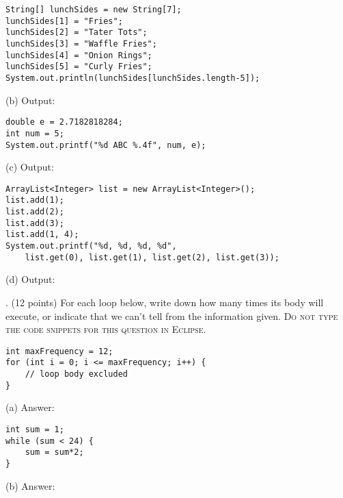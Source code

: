 \documentclass[12pt,twoside]{article}
\newcommand{\fillInBlank}[1][0.5in]{\underline{\hspace{#1}}}
\begin{document}
\vfill
\hfill
\begin{minipage}{0.60\linewidth}
\begin{lstlisting}
String[] lunchSides = new String[7];
lunchSides[1] = "Fries";
lunchSides[2] = "Tater Tots";
lunchSides[3] = "Waffle Fries";
lunchSides[4] = "Onion Rings";
lunchSides[5] = "Curly Fries";
System.out.println(lunchSides[lunchSides.length-5]);
\end{lstlisting}
\end{minipage}
\hspace{0.25in}
(b) Output: \fillInBlank[1in]

\vfill
\hfill
\begin{minipage}{0.60\linewidth}
\begin{lstlisting}
double e = 2.7182818284;
int num = 5;
System.out.printf("%d ABC %.4f", num, e);
\end{lstlisting}
\end{minipage}
\hspace{0.25in}
(c) Output: \fillInBlank[1in]

\vfill

\hfill
\begin{minipage}{0.60\linewidth}
\begin{lstlisting}
ArrayList<Integer> list = new ArrayList<Integer>();
list.add(1);
list.add(2);
list.add(3);
list.add(1, 4);
System.out.printf("%d, %d, %d, %d", 
	list.get(0), list.get(1), list.get(2), list.get(3));
\end{lstlisting}
\end{minipage}
\hspace{0.25in}
(d) Output: \fillInBlank[1in]
\vfill


. (12 points) For each loop below, write down how many times its body will execute, or indicate that we can't tell from the information given. \textsc{Do not type the code snippets for this question in Eclipse}.

\hfill
\begin{minipage}{0.58\linewidth}
\begin{lstlisting}
int maxFrequency = 12;
for (int i = 0; i <= maxFrequency; i++) {
	// loop body excluded
}
\end{lstlisting}
\end{minipage}
\hspace{0.25in}
\begin{minipage}[t]{0.25\linewidth}
(a) Answer: \fillInBlank
\end{minipage}
\vfill

\hfill
\begin{minipage}{0.58\linewidth}
\begin{lstlisting}
int sum = 1;
while (sum < 24) {
	sum = sum*2;
}
\end{lstlisting}
\end{minipage}
\hspace{0.25in}
\begin{minipage}[t]{0.25\linewidth}
(b) Answer: \fillInBlank
\end{minipage}
\vfill
\end{document}
